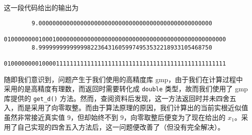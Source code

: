 	\begin{myverbatim}
		
	\end{myverbatim}
	
	这一段代码给出的输出为
	
	\begin{verbatim}
		9.00000000000000000000000000000000000000000000000000
		0100000000100010000000000000000000000000000000000000000000000000
		8.99999999999999822364316059974953532218933105468750
		0100000000100001111111111111111111111111111111111111111111111111
	\end{verbatim}
	
	随即我们意识到，问题产生于我们使用的高精度库 gmp，由于我们在计算过程中采用的是高精度有理数，而返回时需要转化成 \verb|double| 类型，故而我们使用了 gmp 库提供的 \verb|get_d()| 方法。然而，查阅资料后发现，这一方法返回时并未四舍五入，而是采用了向零取整。而由于算法原理的原因，我们计算出的当前实根近似值虽然非常接近真实值 $9$，但却始终不到 $9$，向零取整后便变为了现在给出的 $x_1$。采用了自己实现的四舍五入方法后，这一问题便改善了（但没有完全解决）。
